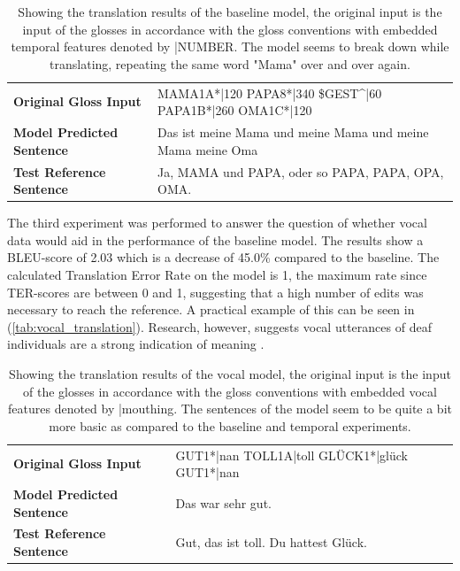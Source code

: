 \begin{table}[h]
\centering
\caption{Showing the translation results of the baseline model, the original input is the input of the glosses in accordance with the gloss conventions with embedded temporal features denoted by |NUMBER. The model seems to break down while translating, repeating the same word "Mama" over and over again.}

\begin{tabular}{ll}
\textbf{Original Gloss Input}     &MAMA1A*|120 PAPA8*|340 \$GEST\textasciicircum{}|60 PAPA1B*|260 OMA1C*|120  \\
\textbf{Model Predicted Sentence} & Das ist meine Mama und meine Mama und meine Mama meine Oma  \\     
\textbf{Test Reference Sentence}  & Ja, MAMA und PAPA, oder so PAPA, PAPA, OPA, OMA.              \\                       \bottomrule                                                    
\end{tabular}

\label{tab:temporal_translation}
\end{table}

The third experiment was performed to answer the question of whether vocal data would aid in the performance of the baseline model. The results show a BLEU-score of 2.03 which is a decrease of 45.0\% compared to the baseline. The calculated Translation Error Rate on the model is 1, the maximum rate since TER-scores are between 0 and 1, suggesting that a high number of edits was necessary to reach the reference. A practical example of this can be seen in (\autoref{tab:vocal_translation}). Research, however, suggests vocal utterances of deaf individuals are a strong indication of meaning \cite{konradoffentliches}.

\begin{table}[h]
\centering
\caption{Showing the translation results of the vocal model, the original input is the input of the glosses in accordance with the gloss conventions with embedded vocal features denoted by |mouthing. The sentences of the model seem to be quite a bit more basic as compared to the baseline and temporal experiments.}

\begin{tabular}{ll}

\textbf{Original Gloss Input}     & GUT1*|nan TOLL1A|toll GLÜCK1*|glück GUT1*|nan \\
\textbf{Model Predicted Sentence} & Das war sehr gut.                                                                                     \\
\textbf{Test Reference Sentence}  & Gut, das ist toll. Du hattest Glück.        \\                                      
\bottomrule
\end{tabular}

\label{tab:vocal_translation}
\end{table}

